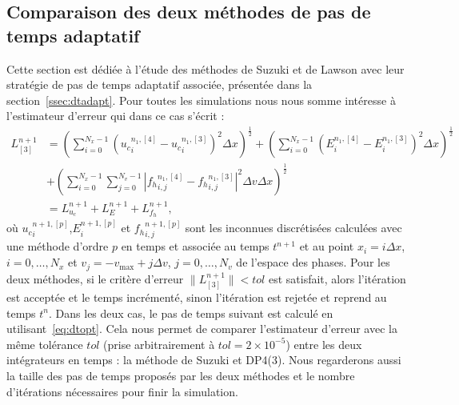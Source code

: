 \FloatBarrier

\subsection{Comparaison des deux méthodes de pas de temps adaptatif}
\label{ssec:2:dtn}

Cette section est dédiée à l'étude des méthodes de Suzuki et de Lawson avec leur stratégie de pas de temps adaptatif associée, présentée dans la section~\ref{ssec:dtadapt}. Pour toutes les simulations nous nous somme intéresse à l'estimateur d'erreur qui dans ce cas s'écrit :
\begin{equation}
  \begin{aligned}
    L^{n+1}_{[3]} & = \left(\sum_{i=0}^{N_x-1}\left( {u_c}_i^{n_1,[4]}-{u_c}_i^{n_1,[3]} \right)^2\Delta x\right)^{\frac{1}{2}}
                    + \left(\sum_{i=0}^{N_x-1}\left( {E}_i^{n_1,[4]}-{E}_i^{n_1,[3]} \right)^2\Delta x\right)^{\frac{1}{2}} \\
                  & + \left(\sum_{i=0}^{N_x-1}\sum_{j=0}^{N_v-1}\left| {f_h}_{i,j}^{n_1,[4]}-{f_h}_{i,j}^{n_1,[3]} \right|^2\Delta v\Delta x\right)^{\frac{1}{2}} \\
                  & = L_{u_c}^{n+1} + L_{E}^{n+1} + L_{f_h}^{n+1},
  \end{aligned}
  \label{eq:LucEfh:localerror}
\end{equation}
où ${u_c}_i^{n+1,[p]}$,${E}_i^{n+1,[p]}$ et ${f_h}_{i,j}^{n+1,[p]}$ sont les inconnues discrétisées calculées avec une méthode d'ordre $p$ en temps et associée au temps $t^{n+1}$ et au point $x_i=i\Delta x$, $i=0,\dots,N_x$ et $v_j = -v_\text{max} + j\Delta v$, $j=0,\dots,N_v$ de l'espace des phases. Pour les deux méthodes, si le critère d'erreur $\|L_{[3]}^{n+1}\|<tol$ est satisfait, alors l'itération est acceptée et le temps incrémenté, sinon l'itération est rejetée et reprend au temps $t^n$. Dans les deux cas, le pas de temps suivant est calculé en utilisant~\eqref{eq:dtopt}. Cela nous permet de comparer l'estimateur d'erreur avec la même tolérance $tol$ (prise arbitrairement à $tol=2\times10^{-5}$) entre les deux intégrateurs en temps : la méthode de Suzuki et DP4(3). Nous regarderons aussi la taille des pas de temps proposés par les deux méthodes et le nombre d'itérations nécessaires pour finir la simulation.

